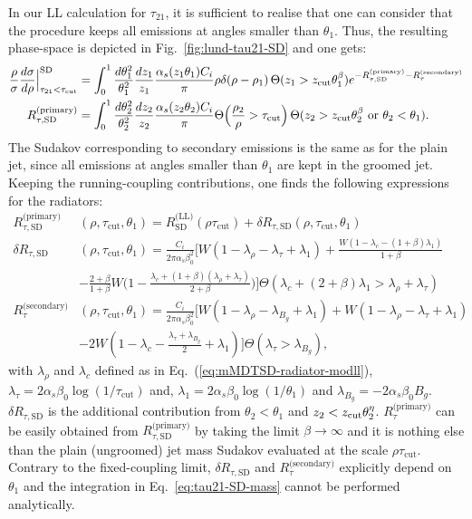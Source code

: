 In our LL calculation for $\tau_{21}$, it is sufficient to realise
that one can consider that the \SD procedure keeps all emissions at
angles smaller than $\theta_1$. Thus, the resulting phase-space is depicted in
Fig.~\ref{fig:lund-tau21-SD} and one gets:
\begin{align}
  \frac{\rho}{\sigma} \frac{d\sigma}{d\rho}\Big|_{\tau_{21}<\tau_\text{cut}}^\text{SD}
  & = \int_0^1 \frac{d\theta_1^2}{\theta_1^2}\frac{dz_1}{z_1}
      \frac{\alpha_s(z_1\theta_1)C_i}{\pi}\rho\delta(\rho-\rho_1)
      \,\Theta(z_1>z_{\text{cut}}\theta_1^\beta)
      e^{-R_{\tau,\text{SD}}^\text{(primary)}-R_\tau^\text{(secondary)}}\label{eq:tau21-SD-mass}\\
  R^\text{(primary)}_{\tau,\text{SD}}
    & =  \int_0^1 \frac{d\theta_2^2}{\theta_2^2}\frac{dz_2}{z_2}
      \frac{\alpha_s(z_2\theta_2)C_i}{\pi}\Theta\Big(\frac{\rho_2}{\rho}>\tau_\text{cut}\Big)
      \,\Theta(z_2>z_{\text{cut}}\theta_2^\beta\text{ or }\theta_2<\theta_1).\label{eq:tau21-SD-Rprimary}
\end{align}
The Sudakov corresponding to secondary emissions is the same as for
the plain jet, since all emissions at angles smaller than $\theta_1$
are kept in the groomed jet.
%
Keeping the running-coupling contributions, one finds the following
expressions for the radiators:
\begin{align}
  R^\text{(primary)}_{\tau,\text{SD}}&(\rho,\tau_\text{cut},\theta_1)
  =R_{\text{SD}}^{\text{(LL)}}(\rho\tau_\text{cut}) + \delta
    R_{\tau,\text{SD}}(\rho,\tau_\text{cut},\theta_1)  \\
  \delta R_{\tau,\text{SD}}&(\rho,\tau_\text{cut},\theta_1)
  = \frac{C_i}{2\pi\alpha_s\beta_0^2}\bigg[
    W(1-\lambda_\rho-\lambda_\tau+\lambda_1)
    +\frac{W(1-\lambda_c-(1+\beta)\lambda_1)}{1+\beta}\\
 & -\frac{2+\beta}{1+\beta}W\Big(1-\frac{\lambda_c+(1+\beta)(\lambda_\rho+\lambda_\tau)}{2+\beta}\Big)    
  \bigg]\Theta(\lambda_c+(2+\beta)\lambda_1 > \lambda_\rho+\lambda_\tau)\nonumber\\
  R_\tau^\text{(secondary)}&(\rho,\tau_\text{cut},\theta_1)
  = \frac{C_i}{2\pi\alpha_s\beta_0^2}\bigg[
    W(1-\lambda_\rho-\lambda_{B_g}+\lambda_1)
    +W(1-\lambda_\rho-\lambda_\tau+\lambda_1)\\
  & -2W(1-\lambda_c-\frac{\lambda_\tau+\lambda_{B_g}}{2}+\lambda_1)
    \bigg]\Theta(\lambda_\tau>\lambda_{B_g}),\nonumber
\end{align}
with $\lambda_\rho$ and $\lambda_c$ defined as in
Eq.~(\ref{eq:mMDTSD-radiator-modll}),
$\lambda_\tau=2\alpha_s\beta_0\log(1/\tau_\text{cut})$ and, 
$\lambda_1=2\alpha_s\beta_0\log(1/\theta_1)$ and
$\lambda_{B_g}=-2\alpha_s\beta_0B_g$.
%
$\delta R_{\tau,\text{SD}}$ is the additional contribution from
$\theta_2<\theta_1$ and $z_2<z_{\text{cut}}\theta_2^\eta$.
$R_\tau^\text{(primary)}$ can be easily obtained from
$R^\text{(primary)}_{\tau,\text{SD}}$ by taking the limit
$\beta\to\infty$ and it is nothing else than the plain (ungroomed) jet
mass Sudakov  evaluated at the scale $\rho\tau_\text{cut}$.
Contrary to the fixed-coupling limit, $\delta R_{\tau,\text{SD}}$ and
$R_\tau^\text{(secondary)}$ explicitly depend on $\theta_1$ and the
integration in Eq.~\eqref{eq:tau21-SD-mass} cannot be performed analytically.


